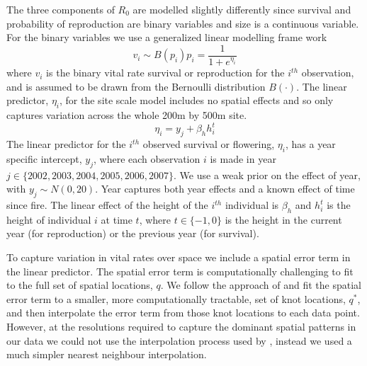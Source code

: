 \documentclass[12pt,a4paper]{article}
\begin{document}
The three components of $R_0$ are modelled slightly differently since survival and probability of reproduction are binary variables and size is a continuous variable. For the binary variables we use a generalized linear modelling frame work   
\begin{subequations}
	\label{eq:site_bin} 
	\begin{equation}
		v_i \sim B(p_i)
	\end{equation}      	
	\begin{equation}
		p_i = \frac{1}{1 + e^{\eta_i}}
	\end{equation}      
\end{subequations}
where $v_i$ is the binary vital rate survival or reproduction for the $i^{th}$ observation, and is assumed to be drawn from the Bernoulli distribution $B(\cdot)$. The linear predictor, $\eta_i$, for the site scale model includes no spatial effects and so only captures variation across the whole 200m by 500m site. 
\begin{equation}
	\label{eq:site_lp}
	\eta_i = y_j + \beta_h h_i^t	  
\end{equation}      
The linear predictor for the $i^{th}$ observed survival or flowering, $\eta_i$, has a year specific intercept, $y_j$, where each observation $i$ is made in year $j \in \{2002, 2003, 2004, 2005, 2006, 2007\}$. We use a weak prior on the effect of year, with $y_j \sim N(0, 20)$. Year captures both year effects and a known effect of time since fire. The linear effect of the height of the $i^{th}$ individual is $\beta_h$ and $h_i^t$ is the height of individual $i$ at time $t$, where $t \in \{-1, 0\}$ is the height in the current year (for reproduction) or the previous year (for survival). 

To capture variation in vital rates over space we include a spatial error term in the linear predictor. The spatial error term is computationally challenging to fit to the full set of spatial locations, $q$. We follow the approach of \citep{Vian2013} and fit the spatial error term to a smaller, more computationally tractable, set of knot locations, $q^*$, and then interpolate the error term from those knot locations to each data point. However, at the resolutions required to capture the dominant spatial patterns in our data we could not use the interpolation process used by \citep{Vian2013}, instead we used a much simpler nearest neighbour interpolation. 
\end{document}

